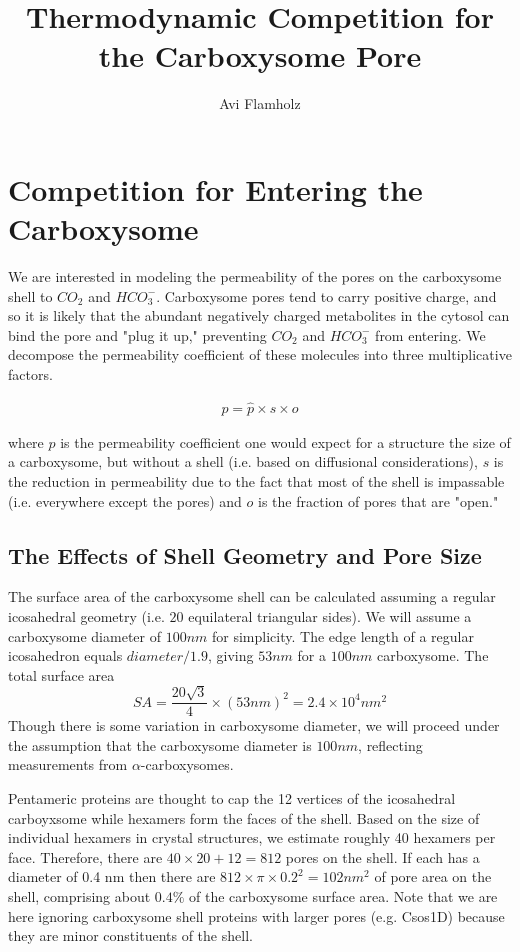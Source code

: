 \documentclass[10pt,a4paper]{article}
\begin{document}
\title{Thermodynamic Competition for the Carboxysome Pore}
\author{Avi Flamholz}
\maketitle

\section{Competition for Entering the Carboxysome}
We are interested in modeling the permeability of the pores on the carboxysome shell to $CO_2$ and $HCO_3^-$. Carboxysome pores tend to carry positive charge, and so it is likely that the abundant negatively charged metabolites in the cytosol can bind the pore and "plug it up," preventing $CO_2$ and $HCO_3^-$ from entering. We decompose the permeability coefficient of these molecules into three multiplicative factors.

\begin{eqnarray}
p = \hat{p} \times s \times o
\end{eqnarray}

where $\hat{p}$ is the permeability coefficient one would expect for a structure the size of a carboxysome, but without a shell (i.e. based on diffusional considerations), $s$ is the reduction in permeability due to the fact that most of the shell is impassable (i.e. everywhere except the pores) and $o$ is the fraction of pores that are "open."

\subsection{The Effects of Shell Geometry and Pore Size}
The surface area of the carboxysome shell can be calculated assuming a regular icosahedral geometry (i.e. $20$ equilateral triangular sides). We will assume a carboxysome diameter of $100 nm$ for simplicity. The edge length of a regular icosahedron equals $diameter/1.9$, giving $53 nm$ for a $100 nm$ carboxysome. The total surface area 
\begin{equation}
SA = \frac{20 \sqrt{3}}{4} \times \left( 53 nm \right)^2 = 2.4 \times 10^4 nm^2
\end{equation}
Though there is some variation in carboxysome diameter, we will proceed under the assumption that the carboxysome diameter is $100 nm$, reflecting measurements from $\alpha$-carboxysomes.

Pentameric proteins are thought to cap the 12 vertices of the icosahedral carboyxsome while hexamers form the faces of the shell. Based on the size of individual hexamers in crystal structures, we estimate roughly 40 hexamers per face. Therefore, there are $40 \times 20 + 12 = 812$ pores on the shell. If each has a diameter of 0.4 nm then there are $812 \times \pi \times 0.2^2 = 102 nm^2$ of pore area on the shell, comprising about $0.4\%$ of the carboxysome surface area. Note that we are here ignoring carboxysome shell proteins with larger pores (e.g. Csos1D) because they are minor constituents of the shell. 
\end{document}
